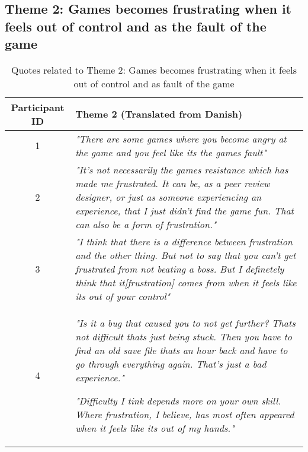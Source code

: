 \subsection{Theme 2: Games becomes frustrating when it feels out of control and as the fault of the game}\label{Theme 2}
\begin{table}[H]

\centering
\begin{tabular}{@{}c p{11cm}@{}}
\toprule
\textbf{Participant ID} & \textbf{Theme 2} (Translated from Danish)\\
\midrule

1 & \textit{"There are some games where you become angry at the game and you feel like its the games fault"}\\

\midrule

2& \textit{"It's not necessarily the games resistance which has made me frustrated. It can be, as a peer review designer, or just as someone experiencing an experience, that I just didn't find the game fun. That can also be a form of frustration."}\\

\midrule

3& \textit{"I think that there is a difference between frustration and the other thing. But not to say that you can't get frustrated from not beating a boss. But I definetely think that it[frustration] comes from when it feels like its out of your control"}\\

\midrule

4 & \textit{"Is it a bug that caused you to not get further? Thats not difficult thats just being stuck. Then you have to find an old save file thats an hour back and have to go through everything again. That's just a bad experience."}

\vspace{0.3cm}

\textit{"Difficulty I tink depends more on your own skill. Where frustration, I believe, has most often appeared when it feels like its out of my hands."}\\

\bottomrule
\end{tabular}

\caption{Quotes related to Theme 2: Games becomes frustrating when it feels out of control and as fault of the game}
\label{tab:theme2-quotes}
\end{table}

